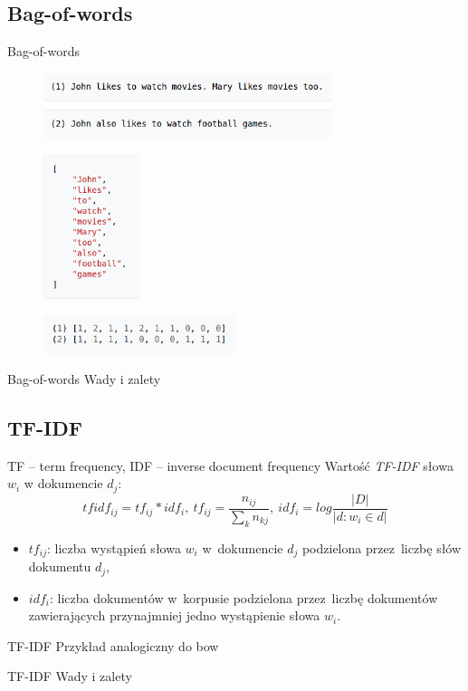 \documentclass{beamer}
\begin{document}
	\subsection{Bag-of-words}
	\begin{frame}{Bag-of-words}
		\begin{figure}
			\centering
			\includegraphics[width=0.75\textwidth]{img/bow_sents.png}
		\end{figure}
		\pause
		\begin{figure}
			\centering
			\includegraphics[width=0.25\textwidth]{img/bow_dict.png}
		\end{figure}
		\pause
		\begin{figure}
			\centering
			\includegraphics[width=0.5\textwidth]{img/bow_repr.png}
		\end{figure}
	\end{frame}
	\begin{frame}{Bag-of-words}
		Wady i zalety
	\end{frame}
	\subsection{TF-IDF}
	\begin{frame}{TF – term frequency, IDF – inverse document frequency}
		Wartość \textit{TF-IDF} słowa $w_i$ w dokumencie $d_j$:
		\begin{equation}
		\label{eq:tf-idf}
		tfidf_{ij} = tf_{ij} * idf_i,\ tf_{ij} = \frac{n_{ij}}{\sum\limits_{k}n_{kj}},\ idf_i = log\frac{|D|}{|{d:w_i \in d}|}
		\end{equation}
		\begin{itemize}
			\item $tf_{ij}$: liczba wystąpień słowa $w_i$ w~dokumencie $d_j$ podzielona przez~liczbę słów dokumentu $d_j$,
			\item $idf_i$: liczba dokumentów w~korpusie podzielona przez~liczbę dokumentów zawierających przynajmniej jedno wystąpienie słowa $w_i$.
		\end{itemize}
	\end{frame}
	\begin{frame}{TF-IDF}
		Przykład analogiczny do bow
	\end{frame}
	\begin{frame}{TF-IDF}
		Wady i zalety
	\end{frame}
\end{document}

